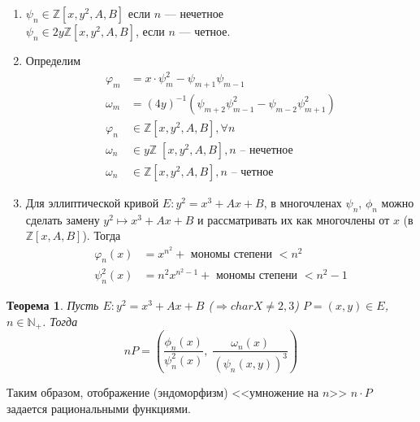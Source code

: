 \documentclass[12pt]{article}
\newcommand{\N}{{{\mathbb N}}}
\newcommand{\Z}{{{\mathbb Z}}}
\newtheorem{theorem}{Теорема}
\theoremstyle{definition}
\theoremstyle{definition}
\theoremstyle{definition}
\begin{document}
\begin{enumerate}
	\item 
    	${\psi _n} \in \Z[x, y^2, A, B]$ если $n$ — нечетное \\
    	${\psi _n} \in 2y\Z[x, y^2, A, B]$, если $n$ — четное. 
	\item Определим
    	\begin{align*}
    	{\varphi _m} &= x \cdot \psi _m^2 - {\psi _{m + 1}}{\psi _{m - 1}} \\
    	{\omega _m} &= {\left( {4y} \right)^{ - 1}}\left( {{\psi _{m + 2}}\psi _{m - 1}^2 - {\psi _{m - 2}}\psi _{m + 1}^2} \right) \\
    	{\varphi _n} &\in \Z\left[ {x, {y^2},A,B} \right], \forall n \\
    	{\omega _n} &\in y\Z\;\left[ {x, {y^2},A,B} \right], n{\text{  --  нечетное}} \\
    	{\omega _n} &\in \Z\left[ {x, {y^2},A,B} \right],n{\text{ -- четное}}
    	\end{align*}

	
	\item Для эллиптической кривой $E: {y^2} = {x^3} + Ax + B$, в многочленах ${\psi _n}$, ${\phi _n}$ можно сделать замену ${y^2} \mapsto {x^3} + Ax + B$ и рассматривать их как многочлены от $x$ (в $\Z\left[ {x,A,B} \right]$). Тогда 
    	\begin{align*}
    	{\varphi _n}\left( x \right) &= {x^{{n^2}}} + {\text{ мономы степени }} < {n^2} \\
    	\psi _n^2\left( x \right) &= {n^2}{x^{{n^2} - 1}} + {\text{ мономы степени }} < {n^2} - 1
    	\end{align*}

\end{enumerate}

\begin{theorem}
	\label{theor_03}
	Пусть $E: {y^2} = {x^3} + Ax + B$ ($ \Rightarrow char X \neq 2,3$) $P = \left( {x,y} \right) \in E$, $n \in {\N_+ }$. Тогда
	$$nP = \left( {\frac{{{\phi _n}\left( x \right)}}{{\psi _n^2\left( x \right)}},\;\frac{{{\omega _n}\left( x \right)}}{{{{\left( {{\psi _n}\left( {x,y} \right)} \right)}^3}}}} \right)
	$$
\end{theorem}

Таким образом, отображение (эндоморфизм) <<умножение на $n$>> $n \cdot P$ задается рациональными функциями.
\end{document}
